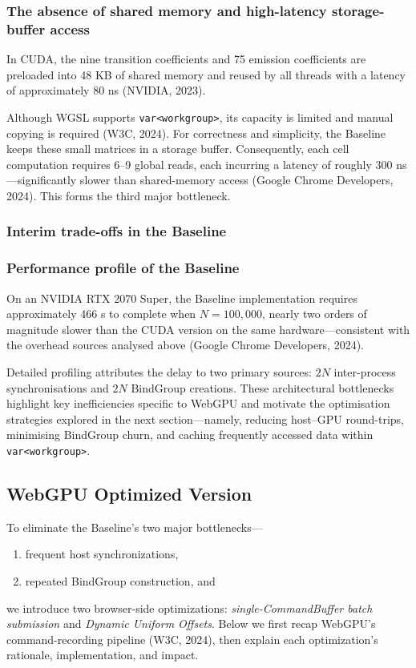 \documentclass[PhD]{PHlab-thesis}
\begin{document}
\subsubsection{The absence of shared memory and high-latency storage-buffer access}
In CUDA, the nine transition coefficients and 75 emission coefficients are preloaded into 48 KB of shared memory and reused by all threads with a latency of approximately 80 ns (NVIDIA, 2023).

Although WGSL supports \texttt{var<workgroup>}, its capacity is limited and manual copying is required (W3C, 2024).  
For correctness and simplicity, the Baseline keeps these small matrices in a storage buffer. Consequently, each cell computation requires 6–9 global reads, each incurring a latency of roughly 300 ns—significantly slower than shared-memory access (Google Chrome Developers, 2024). This forms the third major bottleneck.

\subsubsection{Interim trade-offs in the Baseline}

\subsubsection{Performance profile of the Baseline}
On an NVIDIA RTX 2070 Super, the Baseline implementation requires approximately 466 s to complete when $N = 100{,}000$, nearly two orders of magnitude slower than the CUDA version on the same hardware—consistent with the overhead sources analysed above (Google Chrome Developers, 2024).

Detailed profiling attributes the delay to two primary sources: $2N$ inter-process synchronisations and $2N$ BindGroup creations. These architectural bottlenecks highlight key inefficiencies specific to WebGPU and motivate the optimisation strategies explored in the next section—namely, reducing host–GPU round-trips, minimising BindGroup churn, and caching frequently accessed data within \texttt{var<workgroup>}.



\subsection{WebGPU Optimized Version}
To eliminate the Baseline's two major bottlenecks—
\begin{enumerate}
    \item frequent host synchronizations,
    \item repeated BindGroup construction, and
\end{enumerate}
we introduce two browser-side optimizations: \emph{single-CommandBuffer batch submission} and \emph{Dynamic Uniform Offsets}. Below we first recap WebGPU's command-recording pipeline (W3C, 2024), then explain each optimization's rationale, implementation, and impact.
\end{document}
